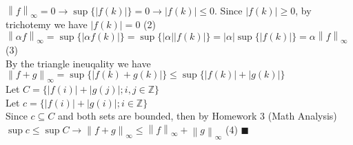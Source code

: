 \documentclass[12pt]{article}
\newcommand{\norm}[1]{\left \lVert#1\right\rVert_\infty}
\begin{document}
\begin{enumerate}
$\norm{f} = 0 \rightarrow \sup\{|f(k)|\} = 0 \rightarrow |f(k)| \leq 0$.  Since $|f(k)| \geq 0$, by trichotemy we have $|f(k)| = 0$ (2)\\ 
$\norm{\alpha f} = \sup\{|\alpha f(k)|\} = \sup\{|\alpha||f(k)|\} =|\alpha|\sup\{|f(k)|\} = \alpha\norm{f}$ (3)\\
By the triangle ineuqality we have\\
$\norm{f+g} = \sup\{|f(k)+g(k)|\} \leq \sup\{|f(k)|+|g(k)|\}$\\
Let $C = \{|f(i)| + |g(j)|; i,j \in \mathbb{Z}\}$\\
Let $c = \{|f(i)| + |g(i)|; i \in \mathbb{Z}\}$\\
Since $c \subseteq C$ and both sets are bounded, then by Homework 3 (Math Analysis) $\sup c \leq \sup C \rightarrow \norm{f+g} \leq \norm{f} + \norm{g}$ (4) $\blacksquare$
\end{enumerate}
\end{document}
